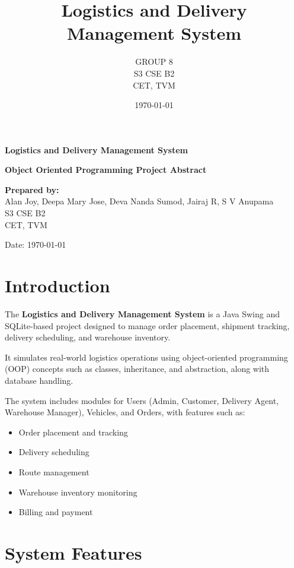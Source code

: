 \documentclass[12pt,a4paper]{article}
\title{Logistics and Delivery Management System}
\author{GROUP 8 \\ S3 CSE B2 \\ CET, TVM}
\date{\today}
\begin{document}
\begin{titlepage}
  \centering
  \vspace*{2.0cm}
  {\LARGE\bfseries Logistics and Delivery Management System \par}
  \vspace{1.5cm}
  {\large \textbf{Object Oriented Programming Project Abstract } \par}
  \vspace{2.0cm}
  {\large \textbf{Prepared by:} \\[6pt] Alan Joy, Deepa Mary Jose, Deva Nanda Sumod, Jairaj R, S V Anupama \\[6pt] S3 CSE B2  \\[6pt] CET, TVM \par}
  \vfill
  {\large Date: \today \par}
  \vspace{1.5cm}
\end{titlepage}

\tableofcontents
\thispagestyle{empty}
\clearpage

\section{Introduction}
The \textbf{Logistics and Delivery Management System} is a Java Swing and SQLite-based project designed to manage order placement, shipment tracking, delivery scheduling, and warehouse inventory.

It simulates real-world logistics operations using object-oriented programming (OOP) concepts such as classes, inheritance, and abstraction, along with database handling.

The system includes modules for Users (Admin, Customer, Delivery Agent, Warehouse Manager), Vehicles, and Orders, with features such as:
\begin{itemize}[noitemsep]
  \item Order placement and tracking
  \item Delivery scheduling
  \item Route management
  \item Warehouse inventory monitoring
  \item Billing and payment
\end{itemize}

\section{System Features}
\end{document}
